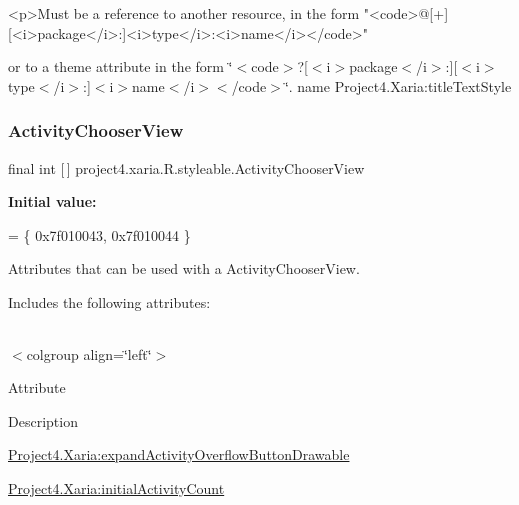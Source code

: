 \begin{DoxyVerb}      <p>Must be a reference to another resource, in the form "<code>@[+][<i>package</i>:]<i>type</i>:<i>name</i></code>"
\end{DoxyVerb}
 or to a theme attribute in the form \char`\"{}$<$code$>$?\mbox{[}$<$i$>$package$<$/i$>$\+:\mbox{]}\mbox{[}$<$i$>$type$<$/i$>$\+:\mbox{]}$<$i$>$name$<$/i$>$$<$/code$>$\char`\"{}.  name Project4.\+Xaria\+:title\+Text\+Style \mbox{\label{classproject4_1_1xaria_1_1R_1_1styleable_a0e91fbde63d227499bc31d982f4a1131}} 
\subsubsection{\texorpdfstring{Activity\+Chooser\+View}{ActivityChooserView}}
{\footnotesize\ttfamily final int \mbox{[}$\,$\mbox{]} project4.\+xaria.\+R.\+styleable.\+Activity\+Chooser\+View\hspace{0.3cm}{\ttfamily [static]}}

{\bfseries Initial value\+:}
\begin{DoxyCode}
= \{
            0x7f010043, 0x7f010044
        \}
\end{DoxyCode}
Attributes that can be used with a Activity\+Chooser\+View. 

Includes the following attributes\+:

\tabulinesep=1mm
\begin{longtabu} spread 0pt [c]{*{0}{|X[-1]}|}
\hline
\end{longtabu}
$<$colgroup align=\char`\"{}left\char`\"{}$>$ 

Attribute

Description 

{\ttfamily \hyperlink{classproject4_1_1xaria_1_1R_1_1styleable_a0bd7975ed1058630234848e0f2e49130}{Project4.\+Xaria\+:expand\+Activity\+Overflow\+Button\+Drawable}}

{\ttfamily \hyperlink{classproject4_1_1xaria_1_1R_1_1styleable_aa4cf4c159c65ab0d4b684efed6e9841d}{Project4.\+Xaria\+:initial\+Activity\+Count}}

